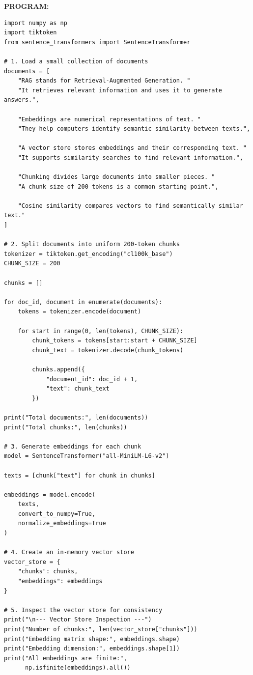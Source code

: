 \documentclass[10pt,a4paper]{article}
\newcommand{\sectionlabel}[1]{\par\vspace{3pt}\noindent\textbf{#1}\par\nopagebreak}
\begin{document}
\sectionlabel{PROGRAM:}
\begin{lstlisting}[style=code]
import numpy as np
import tiktoken
from sentence_transformers import SentenceTransformer

# 1. Load a small collection of documents
documents = [
    "RAG stands for Retrieval-Augmented Generation. "
    "It retrieves relevant information and uses it to generate answers.",

    "Embeddings are numerical representations of text. "
    "They help computers identify semantic similarity between texts.",

    "A vector store stores embeddings and their corresponding text. "
    "It supports similarity searches to find relevant information.",

    "Chunking divides large documents into smaller pieces. "
    "A chunk size of 200 tokens is a common starting point.",

    "Cosine similarity compares vectors to find semantically similar text."
]

# 2. Split documents into uniform 200-token chunks
tokenizer = tiktoken.get_encoding("cl100k_base")
CHUNK_SIZE = 200

chunks = []

for doc_id, document in enumerate(documents):
    tokens = tokenizer.encode(document)

    for start in range(0, len(tokens), CHUNK_SIZE):
        chunk_tokens = tokens[start:start + CHUNK_SIZE]
        chunk_text = tokenizer.decode(chunk_tokens)

        chunks.append({
            "document_id": doc_id + 1,
            "text": chunk_text
        })

print("Total documents:", len(documents))
print("Total chunks:", len(chunks))

# 3. Generate embeddings for each chunk
model = SentenceTransformer("all-MiniLM-L6-v2")

texts = [chunk["text"] for chunk in chunks]

embeddings = model.encode(
    texts,
    convert_to_numpy=True,
    normalize_embeddings=True
)

# 4. Create an in-memory vector store
vector_store = {
    "chunks": chunks,
    "embeddings": embeddings
}

# 5. Inspect the vector store for consistency
print("\n--- Vector Store Inspection ---")
print("Number of chunks:", len(vector_store["chunks"]))
print("Embedding matrix shape:", embeddings.shape)
print("Embedding dimension:", embeddings.shape[1])
print("All embeddings are finite:",
      np.isfinite(embeddings).all())


\end{lstlisting}
\end{document}
